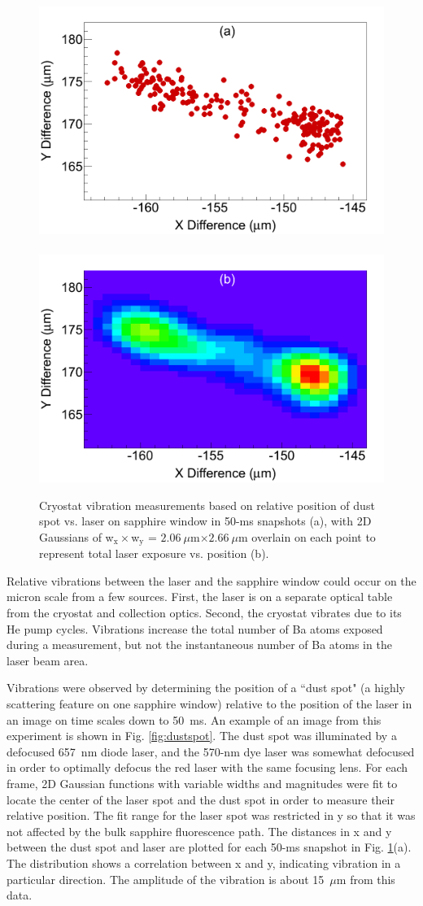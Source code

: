 \begin{figure} %
        \centering
                \includegraphics[width=.5\textwidth]{figures/cryovibes_a.png}
                ~
                \includegraphics[width=.5\textwidth]{figures/cryovibes_b.png}
                \caption{Cryostat vibration measurements based on relative position of dust spot vs. laser on sapphire window in 50-ms snapshots (a), with 2D Gaussians of w$_{\text{x}} \times $w$_{\text{y}}$ = $2.06~\mu$m$ \times 2.66~\mu$m overlain on each point to represent total laser exposure vs. position (b).}
\label{fig:cryovibe2D}
\end{figure}

Relative vibrations between the laser and the sapphire window could occur on the micron scale from a few sources.  First, the laser is on a separate optical table from the cryostat and collection optics.  Second, the cryostat vibrates due to its He pump cycles.  Vibrations increase the total number of Ba atoms exposed during a measurement, but not the instantaneous number of Ba atoms in the laser beam area.

Vibrations were observed by determining the position of a ``dust spot" (a highly scattering feature on one sapphire window) relative to the position of the laser in an image on time scales down to 50~ms.  An example of an image from this experiment is shown in Fig. \ref{fig:dustspot}.  The dust spot was illuminated by a defocused 657~nm diode laser, and the 570-nm dye laser was somewhat defocused in order to optimally defocus the red laser with the same focusing lens. For each frame, 2D Gaussian functions with variable widths and magnitudes were fit to locate the center of the laser spot and the dust spot in order to measure their relative position.  The fit range for the laser spot was restricted in y so that it was not affected by the bulk sapphire fluorescence path.  The distances in x and y between the dust spot and laser are plotted for each 50-ms snapshot in Fig. \ref{fig:cryovibe2D}(a).  The distribution shows a correlation between x and y, indicating vibration in a particular direction.  The amplitude of the vibration is about 15~$\mu$m from this data.

